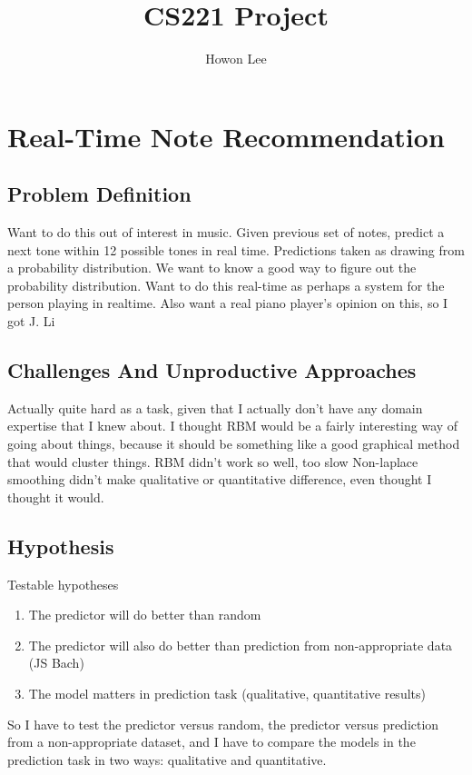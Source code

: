 \documentclass{article}
\begin{document}
\title{CS221 Project}
\author{Howon Lee}
\maketitle
\section*{Real-Time Note Recommendation}

\subsection*{Problem Definition}
Want to do this out of interest in music.
Given previous set of notes, predict a next tone within 12 possible tones in real time.
Predictions taken as drawing from a probability distribution. We want to know a good way to figure out the probability distribution.
Want to do this real-time as perhaps a system for the person playing in realtime.
Also want a real piano player's opinion on this, so I got J. Li

\subsection*{Challenges And Unproductive Approaches}
Actually quite hard as a task, given that I actually don't have any domain expertise that I knew about.
I thought RBM would be a fairly interesting way of going about things, because it should be something like a good graphical method that would cluster things. RBM didn't work so well, too slow
Non-laplace smoothing didn't make qualitative or quantitative difference, even thought I thought it would.

\subsection*{Hypothesis}
Testable hypotheses
\begin{enumerate}
    \item The predictor will do better than random
    \item The predictor will also do better than prediction from non-appropriate data (JS Bach)
    \item The model matters in prediction task (qualitative, quantitative results)
\end{enumerate}
So I have to test the predictor versus random, the predictor versus prediction from a non-appropriate dataset, and I have to compare the models in the prediction task in two ways: qualitative and quantitative.
\end{document}
